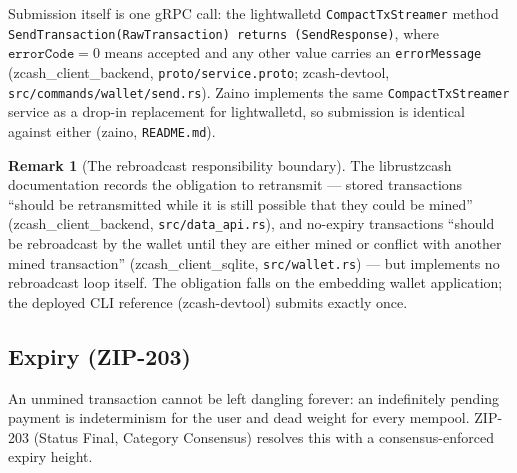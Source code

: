 \documentclass[11pt,a4paper]{article}
\theoremstyle{definition}
\newtheorem{remark}[theorem]{Remark}
\begin{document}
Submission itself is one gRPC call: the lightwalletd
\texttt{CompactTxStreamer} method
\texttt{SendTransaction(RawTransaction) returns (SendResponse)}, where
$\mathtt{errorCode} = 0$ means accepted and any other value carries an
\texttt{errorMessage} (\textsf{zcash\_client\_backend},
\texttt{proto/service.proto}; \textsf{zcash-devtool},
\texttt{src/commands/wallet/send.rs}). Zaino implements the same
\texttt{CompactTxStreamer} service as a drop-in replacement for
lightwalletd, so submission is identical against either
(\textsf{zaino}, \texttt{README.md}).

\begin{remark}[The rebroadcast responsibility boundary]
\label{rem:lifecycle-rebroadcast}
The \textsf{librustzcash} documentation records the obligation to
retransmit --- stored transactions
``should be retransmitted while it is still possible that they could be
mined'' (\textsf{zcash\_client\_backend}, \texttt{src/data\_api.rs}), and
no-expiry transactions ``should be rebroadcast by the wallet until they are
either mined or conflict with another mined transaction''
(\textsf{zcash\_client\_sqlite}, \texttt{src/wallet.rs}) --- but implements
no rebroadcast loop itself. The obligation falls on the embedding wallet
application; the deployed CLI reference (\textsf{zcash-devtool}) submits
exactly once.
\end{remark}

\subsection{Expiry (ZIP-203)}\label{sec:lifecycle-expiry}

An unmined transaction cannot be left dangling forever: an indefinitely
pending payment is indeterminism for the user and dead weight for every
mempool. ZIP-203 (Status Final, Category Consensus) resolves this with a
consensus-enforced expiry height.
\end{document}
